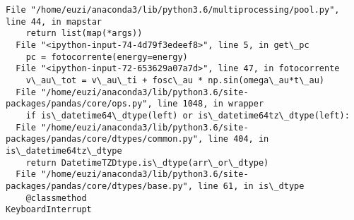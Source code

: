 \documentclass[11pt]{article}
\begin{document}
    \begin{Verbatim}[commandchars=\\\{\}]
  File "/home/euzi/anaconda3/lib/python3.6/multiprocessing/pool.py", line 44, in mapstar
    return list(map(*args))
  File "<ipython-input-74-4d79f3edeef8>", line 5, in get\_pc
    pc = fotocorrente(energy=energy)
  File "<ipython-input-72-653629a07a7d>", line 47, in fotocorrente
    v\_au\_tot = v\_au\_ti + fosc\_au * np.sin(omega\_au*t\_au)
  File "/home/euzi/anaconda3/lib/python3.6/site-packages/pandas/core/ops.py", line 1048, in wrapper
    if is\_datetime64\_dtype(left) or is\_datetime64tz\_dtype(left):
  File "/home/euzi/anaconda3/lib/python3.6/site-packages/pandas/core/dtypes/common.py", line 404, in is\_datetime64tz\_dtype
    return DatetimeTZDtype.is\_dtype(arr\_or\_dtype)
  File "/home/euzi/anaconda3/lib/python3.6/site-packages/pandas/core/dtypes/base.py", line 61, in is\_dtype
    @classmethod
KeyboardInterrupt

    \end{Verbatim}
\end{document}
